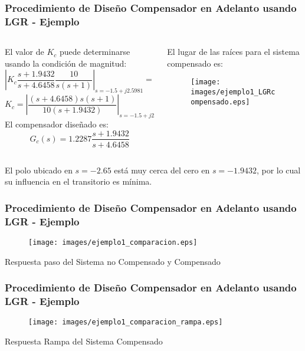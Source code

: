 \documentclass[aspectratio=169,handout]{beamer}
\theoremstyle{definition}
\theoremstyle{plain}
\theoremstyle{remark}
\begin{document}
\begin{frame}[c]\frametitle{Procedimiento de Diseño Compensador en Adelanto usando LGR - Ejemplo}
	\vspace*{2mm}
	\begin{columns}
		\begin{column}{0.5\textwidth}
			El valor de $K_c$ puede determinarse usando la condición de magnitud:
			\begin{equation*}
				\left| K_c \frac{s+1.9432}{s+4.6458} \frac{10}{s(s+1)}\right|_{s = -1.5+j2.5981} = 1
			\end{equation*}
			\pause
			\begin{equation*}
				K_c = \left| \frac{(s+4.6458)s(s+1)}{10(s+1.9432)} \right|_{s = -1.5+j2.5981} = 1.2287
			\end{equation*}
			\pause
			El compensador diseñado es:
			\begin{equation*}
				G_c(s) = 1.2287 \frac{s+1.9432}{s+4.6458}
			\end{equation*}
		\end{column}
		\begin{column}{0.5\textwidth}
			\pause
			El lugar de las raíces para el sistema compensado es:
			\begin{figure}
				\texttt{[image: images/ejemplo1\_LGRcompensado.eps]}
			\end{figure}
		\end{column}
	\end{columns}
	\pause
	El polo ubicado en $s=-2.65$ está muy cerca del cero en $s=-1.9432$, por lo cual su influencia en el transitorio es mínima.
\end{frame}

\begin{frame}[c]\frametitle{Procedimiento de Diseño Compensador en Adelanto usando LGR - Ejemplo}
	\begin{figure}
		\texttt{[image: images/ejemplo1\_comparacion.eps]}
	\end{figure}
	\vspace*{-4mm}
	\centering \small Respuesta paso del Sistema no Compensado y Compensado
\end{frame}

\begin{frame}[c]\frametitle{Procedimiento de Diseño Compensador en Adelanto usando LGR - Ejemplo}
	\begin{figure}
		\texttt{[image: images/ejemplo1\_comparacion\_rampa.eps]}
	\end{figure}
	\vspace*{-4mm}
	\centering \small Respuesta Rampa del Sistema Compensado
\end{frame}
\end{document}
